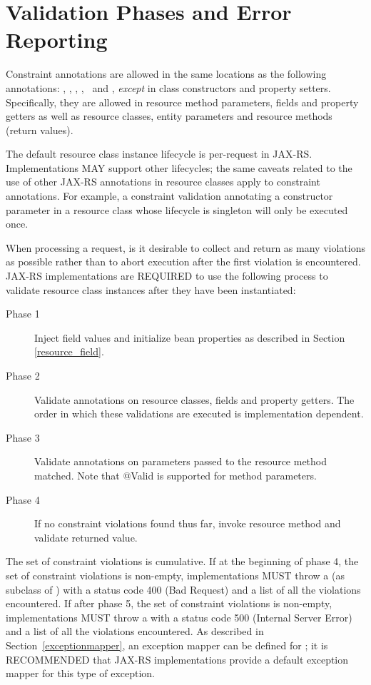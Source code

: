 \section{Validation Phases and Error Reporting}
\label{validation_phases_and_error_reporting}

Constraint annotations are allowed in the same locations as the following annotations: \MatrixParam, \QueryParam, \PathParam, \CookieParam, \HeaderParam\ and \Context, {\em except} in class constructors and property setters. Specifically, they are allowed in resource method parameters, fields and property getters as well as resource classes, entity parameters and resource methods (return values). 

The default resource class instance lifecycle is per-request in JAX-RS. Implementations MAY support other lifecycles; the same caveats related to the use of other JAX-RS annotations in resource classes apply to constraint annotations. For example, a constraint validation annotating a constructor parameter in a resource class whose lifecycle is singleton will only be executed once.

When processing a request, is it desirable to collect and return as many violations as possible rather than to abort execution after the first violation is encountered. JAX-RS implementations are REQUIRED to use the following process to validate resource class instances after they have been instantiated:

\begin{description}
\item[Phase 1] Inject field values and initialize bean properties as described in Section \ref{resource_field}.
\item[Phase 2] Validate annotations on resource classes, fields and property getters. The order in which these validations are executed is implementation dependent.
\item[Phase 3] Validate annotations on parameters passed to the resource method matched. Note that @Valid is supported for method parameters.
\item[Phase 4] If no constraint violations found thus far, invoke resource method and validate returned value.
\end{description}

The set of constraint violations is cumulative. If at the beginning of phase 4, the set of constraint violations is non-empty, implementations MUST throw a  (as subclass of \WebAppExc) with a status code 400 (Bad Request) and a list of all the violations encountered. If after phase 5, the set of constraint violations is non-empty, implementations MUST throw a  with a status code 500 (Internal Server Error) and a list of all the violations encountered. As described in Section~\ref{exceptionmapper}, an exception mapper can be defined for ; it is RECOMMENDED that JAX-RS implementations provide a default exception mapper for this type of exception.

